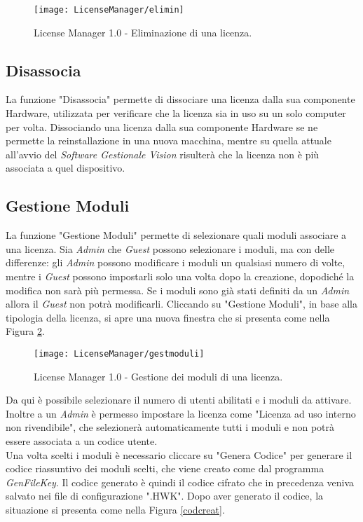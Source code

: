 \begin{figure}[!h] 
    \centering 
    \texttt{[image: LicenseManager/elimin]} 
    \caption{License Manager 1.0 - Eliminazione di una licenza.}
\label{elim}
\end{figure}

\subsection{Disassocia}

La funzione "Disassocia" permette di dissociare una licenza dalla sua componente Hardware, utilizzata per verificare che la licenza sia in uso su un solo computer per volta. 
Dissociando una licenza dalla sua componente Hardware se ne permette la reinstallazione in una nuova macchina, mentre su quella attuale all’avvio del \textit{Software Gestionale Vision} risulterà che la licenza non è più associata a quel dispositivo.

\subsection{Gestione Moduli}
\label{gestmod}
La funzione "Gestione Moduli" permette di selezionare quali moduli associare a una licenza. Sia \textit{Admin} che \textit{Guest} possono selezionare i moduli, ma con delle differenze: gli \textit{Admin} possono modificare i moduli un qualsiasi numero di volte, mentre i \textit{Guest} possono impostarli solo una volta dopo la creazione, dopodiché la modifica non sarà più permessa. Se i moduli sono già stati definiti da un \textit{Admin} allora il \textit{Guest} non potrà modificarli.
Cliccando su "Gestione Moduli", in base alla tipologia della licenza, si apre una nuova finestra che si presenta come nella Figura \ref{gest}.

\begin{figure}[!h] 
    \centering 
    \texttt{[image: LicenseManager/gestmoduli]} 
    \caption{License Manager 1.0 - Gestione dei moduli di una licenza.}
\label{gest}
\end{figure}

Da qui è possibile selezionare il numero di utenti abilitati e i moduli da attivare. Inoltre a un \textit{Admin} è permesso impostare la licenza come "Licenza ad uso interno non rivendibile", che selezionerà automaticamente tutti i moduli e non potrà essere associata a un codice utente.\\
Una volta scelti i moduli è necessario cliccare su "Genera Codice" per generare il codice riassuntivo dei moduli scelti, che viene creato come dal programma \textit{GenFileKey}. Il codice generato è quindi il codice cifrato che in precedenza veniva salvato nei file di configurazione ".HWK".  Dopo aver generato il codice, la situazione si presenta come nella Figura \ref{codcreat}.

